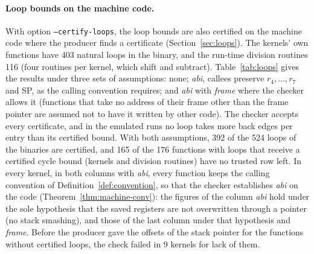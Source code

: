 \documentclass[oneside,english]{amsart}
\numberwithin{equation}{section}
\theoremstyle{plain}
\theoremstyle{definition}
\theoremstyle{plain}
\theoremstyle{plain}
\theoremstyle{remark}
\begin{document}
\paragraph{Loop bounds on the machine code.} With option \texttt{--certify-loops}, the loop bounds are also certified on the machine code where the producer finds a certificate (Section~\ref{sec:loops}). The kernels' own functions have 403 natural loops in the binary, and the run-time division routines 116 (four routines per kernel, which shift and subtract). Table~\ref{tab:loops} gives the results under three sets of assumptions: none; \emph{abi}, callees preserve $r_4, \dots, r_7$ and SP, as the calling convention requires; and \emph{abi} with \emph{frame} where the checker allows it (functions that take no address of their frame other than the frame pointer are assumed not to have it written by other code). The checker accepts every certificate, and in the emulated runs no loop takes more back edges per entry than its certified bound. With both assumptions, 392 of the 524 loops of the binaries are certified, and 165 of the 176 functions with loops that receive a certified cycle bound (kernels and division routines) have no trusted row left. In every kernel, in both columns with \emph{abi}, every function keeps the calling convention of Definition~\ref{def:convention}, so that the checker establishes \emph{abi} on the code (Theorem~\ref{thm:machine-conv}): the figures of the column \emph{abi} hold under the sole hypothesis that the saved registers are not overwritten through a pointer (no stack smashing), and those of the last column under that hypothesis and \emph{frame}. Before the producer gave the offsets of the stack pointer for the functions without certified loops, the check failed in 9 kernels for lack of them.
\end{document}
